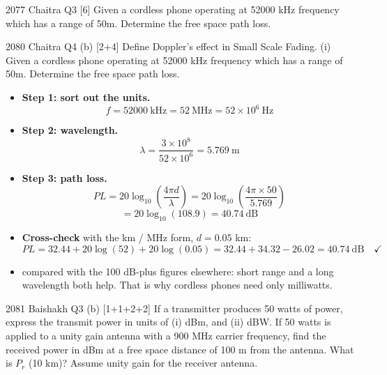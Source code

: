 \begin{asked}{2077 Chaitra \textperiodcentered{} Q3 \textperiodcentered{} [6]}
Given a cordless phone operating at 52000 kHz frequency which has a range of 50m. Determine the
free space path loss.
\end{asked}
\begin{asked}{2080 Chaitra \textperiodcentered{} Q4 (b) \textperiodcentered{} [2+4]}
Define Doppler's effect in Small Scale Fading. (i) Given a cordless phone operating at
52000 kHz frequency which has a range of 50m. Determine the free space path loss.
\end{asked}

\begin{itemize}
  \item \textbf{Step 1: sort out the units.}
        \[ f = 52000\ \text{kHz} = 52\ \text{MHz} = 52\times10^{6}\ \text{Hz} \]
  \item \textbf{Step 2: wavelength.}
        \[ \lambda = \frac{3\times10^{8}}{52\times10^{6}} = 5.769\ \text{m} \]
  \item \textbf{Step 3: path loss.}
        \[ PL = 20\log_{10}\!\left(\frac{4\pi d}{\lambda}\right)
              = 20\log_{10}\!\left(\frac{4\pi \times 50}{5.769}\right) \]
        \[ = 20\log_{10}(108.9) = \boxed{40.74\ \text{dB}} \]
  \item \textbf{Cross-check} with the km / MHz form, $d = 0.05$ km:
        \[ PL = 32.44 + 20\log(52) + 20\log(0.05) = 32.44 + 34.32 - 26.02 = 40.74\ \text{dB}
           \quad\checkmark \]
  \item {} compared with the 100 dB-plus figures elsewhere: short range and
        a long wavelength both help. That is why cordless phones need only milliwatts.
\end{itemize}

\hr

{\color{sub}\footnotesize {} }

\begin{asked}{2081 Baishakh \textperiodcentered{} Q3 (b) \textperiodcentered{} [1+1+2+2]}
If a transmitter produces 50 watts of power, express the transmit power in units of (i) dBm,
and (ii) dBW. If 50 watts is applied to a unity gain antenna with a 900 MHz carrier frequency,
find the received power in dBm at a free space distance of 100 m from the antenna. What is
$P_r$ (10 km)? Assume unity gain for the receiver antenna.
\end{asked}

